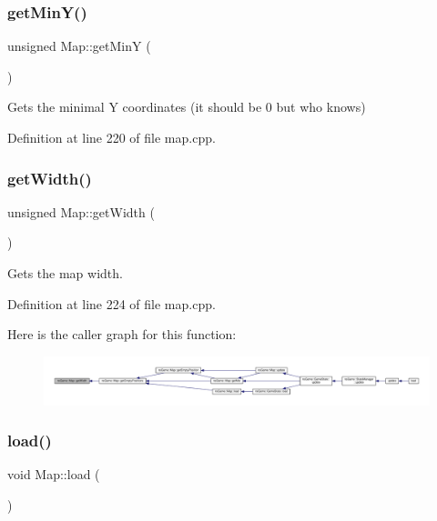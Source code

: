 \subsubsection{\texorpdfstring{get\+Min\+Y()}{getMinY()}}
{\footnotesize\ttfamily unsigned Map\+::get\+MinY (\begin{DoxyParamCaption}{ }\end{DoxyParamCaption})}



Gets the minimal Y coordinates (it should be 0 but who knows) 



Definition at line 220 of file map.\+cpp.

\mbox{\label{classns_game_1_1_map_a948d05a71e53131418c9cf19c2da1062}} 
\subsubsection{\texorpdfstring{get\+Width()}{getWidth()}}
{\footnotesize\ttfamily unsigned Map\+::get\+Width (\begin{DoxyParamCaption}{ }\end{DoxyParamCaption})}



Gets the map width. 



Definition at line 224 of file map.\+cpp.

Here is the caller graph for this function\+:\nopagebreak
\begin{figure}[H]
\begin{center}
\leavevmode
\includegraphics[width=350pt]{classns_game_1_1_map_a948d05a71e53131418c9cf19c2da1062_icgraph}
\end{center}
\end{figure}
\mbox{\label{classns_game_1_1_map_a11fd1b88b5f3c923dad2c88df16e4373}} 
\subsubsection{\texorpdfstring{load()}{load()}}
{\footnotesize\ttfamily void Map\+::load (\begin{DoxyParamCaption}{ }\end{DoxyParamCaption})}



